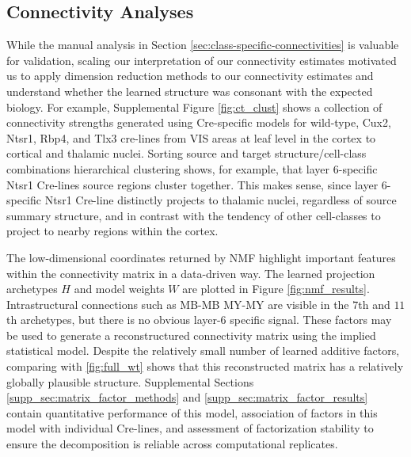 \newpage

\subsection{Connectivity Analyses}

While the manual analysis in Section \ref{sec:class-specific-connectivities} is valuable for validation, scaling our interpretation of our connectivity estimates motivated us to apply dimension reduction methods to our connectivity estimates and understand whether the learned structure was consonant with the expected biology.
For example, Supplemental Figure \ref{fig:ct_clust} shows a collection of connectivity strengths generated using Cre-specific models for wild-type, Cux2, Ntsr1, Rbp4, and Tlx3 cre-lines from VIS areas at leaf level in the cortex to cortical and thalamic nuclei.
Sorting source and target structure/cell-class combinations hierarchical clustering shows, for example, that layer 6-specific Ntsr1 Cre-lines source regions cluster together.
This makes sense, since layer 6-specific Ntsr1 Cre-line distinctly projects to thalamic nuclei, regardless of source summary structure, and in contrast with the tendency of other cell-classes to project to nearby regions within the cortex.

The low-dimensional coordinates returned by NMF highlight important features within the connectivity matrix in a data-driven way.
The learned projection archetypes $H$ and model weights $W$ are plotted in Figure \ref{fig:nmf_results}.
Intrastructural connections such as MB-MB MY-MY are visible in the $7$th and $11$th archetypes, but there is no obvious layer-6 specific signal.
These factors may be used to generate a reconstructured connectivity matrix using the implied statistical model.
Despite the relatively small number of learned additive factors, comparing with \ref{fig:full_wt} shows that this reconstructed matrix has a relatively globally plausible structure.
Supplemental Sections \ref{supp_sec:matrix_factor_methods} and \ref{supp_sec:matrix_factor_results} contain quantitative performance of this model, association of factors in this model with individual Cre-lines, and assessment of factorization stability to ensure the decomposition is reliable across computational replicates.

\newpage

